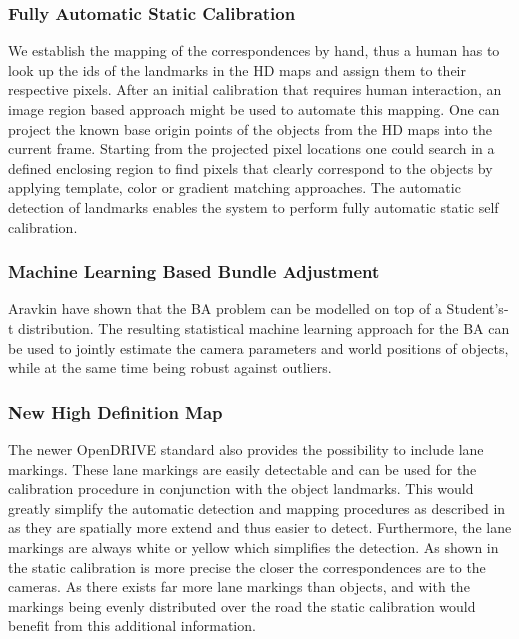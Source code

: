 \subsubsection{Fully Automatic Static Calibration}
\label{sec:auto_mapping_landmarks}
We establish the mapping of the correspondences by hand, thus a human has to look up the ids of the landmarks in the HD maps and assign them to their respective pixels.
After an initial calibration that requires human interaction, an image region based approach might be used to automate this mapping.
One can project the known base origin points of the objects from the HD maps into the current frame.
Starting from the projected pixel locations one could search in a defined enclosing region to find pixels that clearly correspond to the objects by applying template, color or gradient matching approaches.
The automatic detection of landmarks enables the system to perform fully automatic static self calibration.

\subsubsection{Machine Learning Based Bundle Adjustment}
Aravkin \etal \cite{students_t_bundle_adjustment} have shown that the BA problem can be modelled on top of a Student's-t distribution. 
The resulting statistical machine learning approach for the BA can be used to jointly estimate the camera parameters and world positions of objects, while at the same time being robust against outliers.
  
\subsubsection{New High Definition Map}
The newer OpenDRIVE standard also provides the possibility to include lane markings.
These lane markings are easily detectable and can be used for the calibration procedure in conjunction with the object landmarks.
This would greatly simplify the automatic detection and mapping procedures as described in  as they are spatially more extend and thus easier to detect.
Furthermore, the lane markings are always white or yellow which simplifies the detection.
As shown in  the static calibration is more precise the closer the correspondences are to the cameras. 
As there exists far more lane markings than objects, and with the markings being evenly distributed over the road the static calibration would benefit from this additional information.